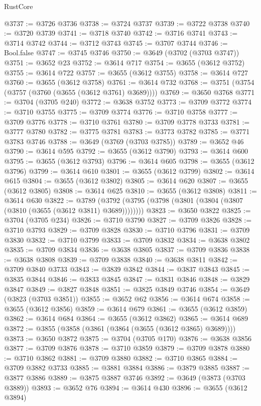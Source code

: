 \begin{lexlean}{RustCore}
\begin{coremodule}
@3737 := @3726 @3736
@3738 := @3724 @3737
@3739 := @3722 @3738
@3740 := @3720 @3739
@3741 := @3718 @3740
@3742 := @3716 @3741
@3743 := @3714 @3742
@3744 := @3712 @3743
@3745 := @3707 @3744
@3746 := Bool.false
@3747 := @3745 @3746
@3750 := @3649 (@3702 (@3703 @3747))
@3751 := @3652 @23
@3752 := @3614 @717
@3754 := @3655 (@3612 @3752)
@3755 := @3614 @722
@3757 := @3655 (@3612 @3755)
@3758 := @3614 @727
@3760 := @3655 (@3612 @3758)
@3761 := @3614 @732
@3768 := @3751 (@3754 (@3757 (@3760 (@3655 (@3612 @3761) @3689))))
@3769 := @3650 @3768
@3771 := @3704 (@3705 @240)
@3772 := @3638 @3752
@3773 := @3709 @3772
@3774 := @3710 @3755
@3775 := @3709 @3774
@3776 := @3710 @3758
@3777 := @3709 @3776
@3778 := @3710 @3761
@3780 := @3709 @3778 @3733
@3781 := @3777 @3780
@3782 := @3775 @3781
@3783 := @3773 @3782
@3785 := @3771 @3783 @3746
@3788 := @3649 (@3769 (@3703 @3785))
@3789 := @3652 @46
@3790 := @3614 @595
@3792 := @3655 (@3612 @3790)
@3793 := @3614 @600
@3795 := @3655 (@3612 @3793)
@3796 := @3614 @605
@3798 := @3655 (@3612 @3796)
@3799 := @3614 @610
@3801 := @3655 (@3612 @3799)
@3802 := @3614 @615
@3804 := @3655 (@3612 @3802)
@3805 := @3614 @620
@3807 := @3655 (@3612 @3805)
@3808 := @3614 @625
@3810 := @3655 (@3612 @3808)
@3811 := @3614 @630
@3822 := @3789 (@3792 (@3795 (@3798 (@3801 (@3804 (@3807 (@3810 (@3655 (@3612 @3811) @3689))))))))
@3823 := @3650 @3822
@3825 := @3704 (@3705 @234)
@3826 := @3710 @3790
@3827 := @3709 @3826
@3828 := @3710 @3793
@3829 := @3709 @3828
@3830 := @3710 @3796
@3831 := @3709 @3830
@3832 := @3710 @3799
@3833 := @3709 @3832
@3834 := @3638 @3802
@3835 := @3709 @3834
@3836 := @3638 @3805
@3837 := @3709 @3836
@3838 := @3638 @3808
@3839 := @3709 @3838
@3840 := @3638 @3811
@3842 := @3709 @3840 @3733
@3843 := @3839 @3842
@3844 := @3837 @3843
@3845 := @3835 @3844
@3846 := @3833 @3845
@3847 := @3831 @3846
@3848 := @3829 @3847
@3849 := @3827 @3848
@3851 := @3825 @3849 @3746
@3854 := @3649 (@3823 (@3703 @3851))
@3855 := @3652 @62
@3856 := @3614 @674
@3858 := @3655 (@3612 @3856)
@3859 := @3614 @679
@3861 := @3655 (@3612 @3859)
@3862 := @3614 @684
@3864 := @3655 (@3612 @3862)
@3865 := @3614 @689
@3872 := @3855 (@3858 (@3861 (@3864 (@3655 (@3612 @3865) @3689))))
@3873 := @3650 @3872
@3875 := @3704 (@3705 @170)
@3876 := @3638 @3856
@3877 := @3709 @3876
@3878 := @3710 @3859
@3879 := @3709 @3878
@3880 := @3710 @3862
@3881 := @3709 @3880
@3882 := @3710 @3865
@3884 := @3709 @3882 @3733
@3885 := @3881 @3884
@3886 := @3879 @3885
@3887 := @3877 @3886
@3889 := @3875 @3887 @3746
@3892 := @3649 (@3873 (@3703 @3889))
@3893 := @3652 @76
@3894 := @3614 @430
@3896 := @3655 (@3612 @3894)

\end{coremodule}
\end{lexlean}
